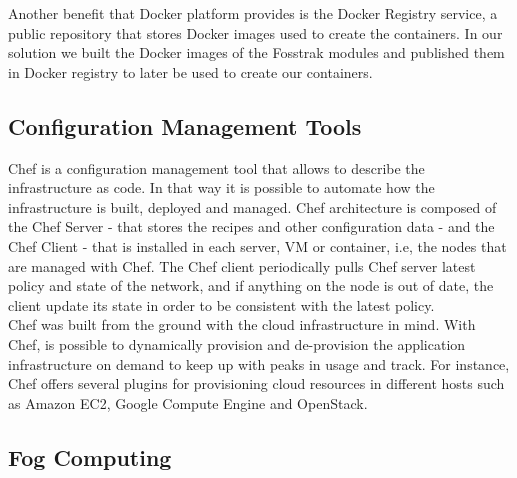 Another benefit that Docker platform provides is the Docker Registry service, a public repository
that stores Docker images used to create the containers. In our solution we built the Docker images
of the Fosstrak modules and published them in Docker registry to later be used to create our containers.

\subsection{Configuration Management Tools}
\label{sub:cm_tools}
Chef is a configuration management tool that allows to describe the infrastructure as code.
In that way it is possible to automate how the infrastructure is built, deployed and managed.
Chef architecture is composed of the Chef Server - that stores the recipes and other configuration
data - and the Chef Client - that is installed in each server, VM or container, i.e, the nodes that
are managed with Chef. The Chef client periodically pulls Chef server latest policy and state of the
network, and if anything on the node is out of date, the client update its state in order to be
consistent with the latest policy.\\

Chef was built from the ground with the cloud infrastructure in mind. With Chef, is possible to
dynamically provision and de-provision the application infrastructure on demand to keep up with
peaks in usage and track. For instance, Chef offers several plugins for provisioning cloud resources
in different hosts such as Amazon EC2, Google Compute Engine and OpenStack.

\subsection{Fog Computing}
\label{sub:Fog Computing}
